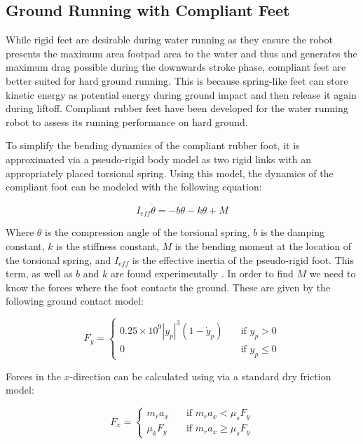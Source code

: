 \documentclass[letterpaper]{article}
\begin{document}
\subsection{Ground Running with Compliant Feet}
While rigid feet are desirable during water running as they ensure the robot presents the maximum area footpad area to the water and thus and generates the maximum drag possible during the downwards stroke phase, compliant feet are better suited for hard ground running. This is because spring-like feet can store kinetic energy as potential energy during ground impact and  then release it again during liftoff. Compliant rubber feet have been developed for the water running robot to assess its running performance on hard ground.

To simplify the bending dynamics of the compliant rubber foot, it is approximated via a pseudo-rigid body model as two rigid links with an appropriately placed torsional spring.  Using this model, the dynamics of the compliant foot can be modeled with the following equation:

\begin{equation}
	I_{eff} \ddot{\theta} = -b\dot{\theta} - k\theta + M
\end{equation} 

Where $\theta$ is the compression angle of the torsional spring, $b$ is the damping constant, $k$ is the stiffness constant, $M$ is the bending moment at the location of the torsional spring, and $I_{eff}$ is the effective inertia of the pseudo-rigid foot. This term, as well as $b$ and $k$ are found experimentally \cite{Park2009}. In order to find $M$ we need to know the forces where the foot contacts the ground. These are given by the following ground contact model:

\begin{equation}
F_y = \left\{ \begin{array}{ll} 0.25 \times 10^9 |y_p|^3 (1 - \dot{y}_p) & \quad \textrm{if $y_p > 0$} \\ 0 & \quad \textrm{if $y_p \le 0$} \end{array} \right.
\end{equation}

\noindent Forces in the $x$-direction can be calculated using via a standard dry friction model:

\begin{equation}
F_x = \left\{ \begin{array}{ll} m_r a_x & \quad \textrm{if $m_r a_x < \mu_s F_y$} \\
			                   \mu_k F_y &\quad \textrm{if $m_r a_x \ge \mu_s F_y$}
			  \end{array} \right.
\end{equation}
\end{document}
